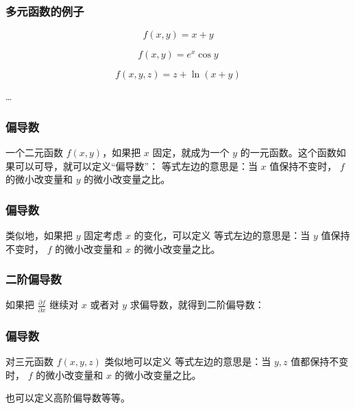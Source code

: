 \documentclass[CJK,13pt]{beamer}
\date{}
\begin{document}
  \bch



  
\begin{frame}
  \frametitle{多元函数的例子}

  $$f(x, y) = x+y$$
  
  $$f(x, y) = e^x \cos y$$

  $$f(x, y, z) = z+ \ln (x+y)$$  

  \ldots
\end{frame}


\begin{frame}
  \frametitle{偏导数}
  一个二元函数 $f(x,y)$，如果把 $x$ 固定，就成为一个 $y$ 的一元函数。这个函数如果可以可导，就可以定义“偏导数”：
  等式左边的意思是：当 $x$ 值保持不变时， $f$ 的微小改变量和 $y$ 的微小改变量之比。

\end{frame}


\begin{frame}
  \frametitle{偏导数}
  类似地，如果把 $y$ 固定考虑 $x$ 的变化，可以定义
  等式左边的意思是：当 $y$ 值保持不变时， $f$ 的微小改变量和 $x$ 的微小改变量之比。
\end{frame}

\begin{frame}
  \frametitle{二阶偏导数}
  如果把 $\frac{\partial f}{\partial x}$ 继续对 $x$ 或者对 $y$ 求偏导数，就得到二阶偏导数：
\end{frame}


\begin{frame}
  \frametitle{偏导数}
  对三元函数 $f(x,y,z)$ 类似地可以定义
  等式左边的意思是：当 $y,z$ 值都保持不变时， $f$ 的微小改变量和 $x$ 的微小改变量之比。

  \skiplines
  
  也可以定义高阶偏导数等等。
\end{frame}
\end{document}
